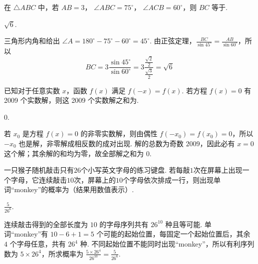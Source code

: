 \begin{problem}

在 \( \triangle ABC \) 中，若 \( AB = 3 \)， \( \angle ABC = 75^\circ \)， \( \angle ACB = 60^\circ \)，则 \(BC\) 等于\fillinblank{}.
\end{problem}

\begin{answer}
\(\sqrt6\).
\end{answer}

\begin{solution}
三角形内角和给出 \(\angle A=180^\circ-75^\circ-60^\circ=45^\circ\). 由正弦定理，\(\frac{BC}{\sin45^\circ}=\frac{AB}{\sin60^\circ}\)，所以
\[
BC=3\frac{\sin45^\circ}{\sin60^\circ}=3\frac{\frac{\sqrt2}{2}}{\frac{\sqrt3}{2}}=\sqrt6
\]
\end{solution}

\begin{problem}

已知对于任意实数 \( x \)，函数 \( f(x) \) 满足 \( f(-x) = f(x) \). 若方程 \( f(x) = 0 \) 有 2009 个实数解，则这 2009 个实数解之和为\fillinblank{}.
\end{problem}

\begin{answer}
\(0\).
\end{answer}

\begin{solution}
若 \(x_0\) 是方程 \(f(x)=0\) 的非零实数解，则由偶性 \(f(-x_0)=f(x_0)=0\)，所以 \(-x_0\) 也是解，非零解成相反数的成对出现. 解的总数为奇数 \(2009\)，因此必有 \(x=0\) 这个解；其余解的和均为零，故全部解之和为 \(0\).
\end{solution}

\begin{problem}

一只猴子随机敲击只有\(26\)个小写英文字母的练习键盘. 若每敲\(1\)次在屏幕上出现一个字母，它连续敲击\(10\)次，屏幕上的\(10\)个字母依次排成一行，则出现单词“\mbox{monkey}”的概率为\fillinblank{}（结果用数值表示）.
\end{problem}

\begin{answer}
\(\frac{5}{26^6}\).
\end{answer}

\begin{solution}
连续敲击得到的全部长度为 \(10\) 的字母序列共有 \(26^{10}\) 种且等可能. 单词“\mbox{monkey}”有 \(10-6+1=5\) 个可能的起始位置，每固定一个起始位置后，其余 \(4\) 个字母任意，共有 \(26^4\) 种. 不同起始位置不能同时出现“\mbox{monkey}”，所以有利序列数为 \(5\times26^4\)，所求概率为 \(\frac{5\times26^4}{26^{10}}=\frac{5}{26^6}\).
\end{solution}


